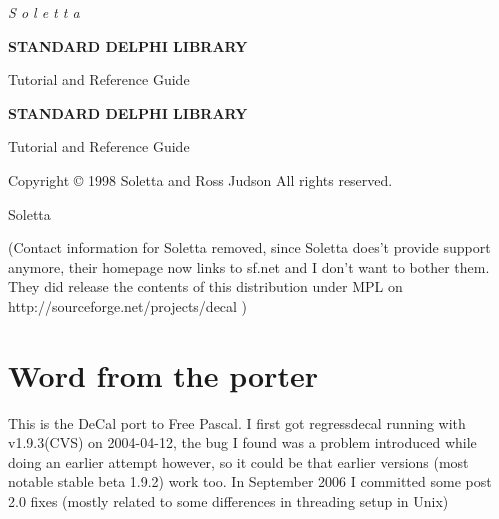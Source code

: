 \documentclass{report}
\begin{document}
\vspace*{\fill} \c
{\large {\it S o l e t t a}}

\vspace{1cm}
 
\begin{center}
{\Huge \textbf{STANDARD DELPHI LIBRARY}}

\vspace{1cm}

{\huge Tutorial and Reference Guide}

\end{center}
\vspace*{\fill}
\newpage

\begin{center}
\vspace*{\fill} \c
{\huge \textbf{STANDARD DELPHI LIBRARY}}

{\huge Tutorial and Reference Guide} 

\vspace{2cm}

{\large Copyright \copyright{} 1998 Soletta and Ross Judson All rights reserved.} 

{\large Soletta}

\vspace{1cm}

(Contact information for Soletta removed, since Soletta does't provide
support anymore, their homepage now links to sf.net and I don't want to
bother them. They did release the contents of this distribution under MPL on
http://sourceforge.net/projects/decal )

%
%
%
%

\end{center}

\vspace*{\fill} 
\newpage
\tableofcontents
\newpage

\chapter{Word from the porter}

This is the DeCal port to Free Pascal. I first got regressdecal running with
v1.9.3(CVS) on 2004-04-12, the bug I found was a problem introduced while
doing an earlier attempt however, so it could be that earlier versions (most
notable stable beta 1.9.2) work too. In September 2006 I committed some post
2.0 fixes (mostly related to some differences in threading setup in Unix)
\end{document}
